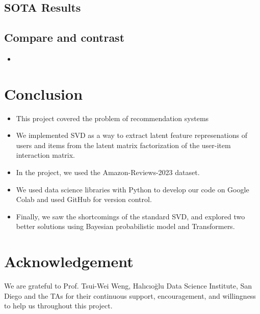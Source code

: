 \documentclass{article}
\begin{document}
\subsection{SOTA Results}

\subsection{Compare and contrast}
\begin{itemize}
    \item
\end{itemize}


\section{Conclusion}
\begin{itemize}
    \item This project covered the problem of recommendation systems
    \item We implemented SVD as a way to extract latent feature represenations of users and items from the latent matrix factorization of the user-item interaction matrix.
    \item In the project, we used the Amazon-Reviews-2023 dataset.
    \item We used data science libraries with Python to develop our code on Google Colab and used GitHub for version control.
    \item Finally, we saw the shortcomings of the standard SVD, and explored two better solutions using Bayesian probabilistic model and Transformers.
\end{itemize}

\section{Acknowledgement}
We are grateful to Prof. Tsui-Wei Weng, Halıcıoğlu Data Science Institute, San Diego and the TAs for their continuous support, encouragement, and willingness to help us throughout this project.



\end{document}
